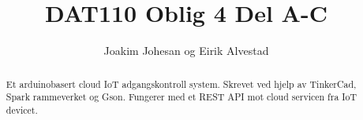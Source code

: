 \documentclass[11pt]{article}
\begin{document}
\title{DAT110 Oblig 4 Del A-C}

\author{Joakim Johesan og Eirik Alvestad}

\maketitle

\begin{abstract}
Et arduinobasert cloud IoT adgangskontroll system. Skrevet ved hjelp av TinkerCad, Spark rammeverket og Gson. Fungerer med et REST API mot cloud servicen fra IoT devicet. 
\end{abstract}
















{}
\end{document}

